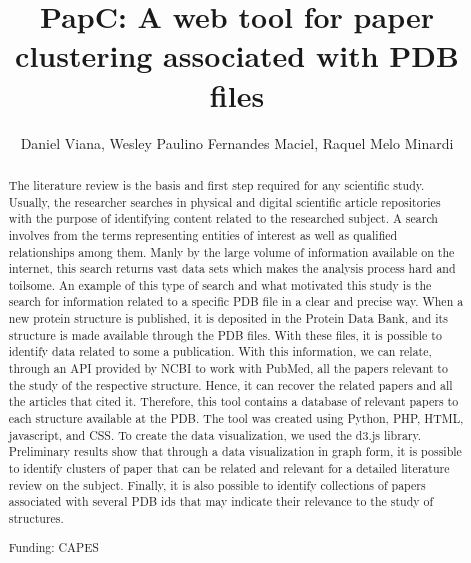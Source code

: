 \documentclass[twoside]{article}
\title{\vspace{-15mm}\fontsize{24pt}{10pt}\selectfont\textbf{ PapC: A web tool for paper clustering associated with PDB files }} %
\author{ Daniel Viana, Wesley Paulino Fernandes Maciel, Raquel Melo Minardi }
\affil{ UFMG }
\date{}
\begin{document}
  
  
  \maketitle %
  
  
  \thispagestyle{fancy} %
  
  
  \begin{abstract}
  The literature review is the basis and first step required for any scientific study. Usually,  the researcher searches in physical and digital scientific article repositories with the purpose of identifying content related to the researched subject. A search involves from the terms representing entities of interest as well as qualified relationships among them. Manly by the large volume of information available on the internet,  this search returns vast data sets which makes the analysis process hard and toilsome. An example of this type of search and what motivated this study is the search for information related to a specific PDB file in a clear and precise way. When a new protein structure is published,  it is deposited in the Protein Data Bank,  and its structure is made available through the PDB files. With these files,  it is possible to identify data related to some a publication. With this information,  we can relate,  through an API provided by NCBI to work with PubMed,  all the papers relevant to the study of the respective structure. Hence,  it can recover the related papers and all the articles that cited it. Therefore,  this tool contains a database of relevant papers to each structure available at the PDB. The tool was created using Python,  PHP,  HTML,  javascript,  and CSS. To create the data visualization,  we used the d3.js library. Preliminary results show that through a data visualization in graph form,  it is possible to identify clusters of paper that can be related and relevant for a detailed literature review on the subject. Finally,  it is also possible to identify collections of papers associated with several PDB ids that may indicate their relevance to the study of structures.
  
  Funding: CAPES \\ 
  \end{abstract}
  
\end{document}
